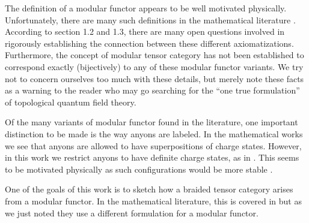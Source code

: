 \documentclass[aps, prl, letterpaper, twocolumn, superscriptaddress, notitlepage, 10pt]{revtex4-1}
\begin{document}
The definition of a modular functor appears to
be well motivated physically.
Unfortunately, there are many such definitions
in the mathematical literature 
\cite{Walker1991,Turaev1994,Bakalov2001,Tillmann1998}.
According to \cite{Bartlett2015} section 1.2 and 1.3,
there are many open questions involved in 
rigorously establishing the connection between these different axiomatizations.
Furthermore, the concept of modular tensor category 
has not been established to correspond exactly
(bijectively) to any of these modular functor variants. 
We try not to concern ourselves too much with these details, 
but merely note these facts as a warning to the reader
who may go searching for the ``one true formulation'' of
topological quantum field theory.

Of the many variants of modular functor found in the literature,
one important distinction to be made is
the way anyons are labeled.
In the mathematical works \cite{Turaev1994, Bakalov2001, Tillmann1998} 
we see that anyons are allowed to have superpositions
of charge states. 
However, in this work we restrict anyons to have
definite charge states, as in \cite{Walker1991,Freedman2002simulation,Beverland2014}. 
This seems to be motivated physically as such configurations
would be more stable .

One of the goals of this work is to sketch how a 
braided tensor category arises from a modular functor.
In the mathematical literature,
this is covered in \cite{Turaev1994,Tillmann1998,Bakalov2001}
but as we just noted they use a different formulation for a
modular functor.


\end{document}
